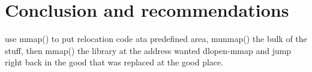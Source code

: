 \chapter{Conclusion and recommendations}\label{cha:conclusion}
use mmap() to put relocation code ata predefined area, munmap() the bulk of the stuff, then mmap() the library at the address wanted dlopen-mmap and jump right back in the good that was replaced at the good place.